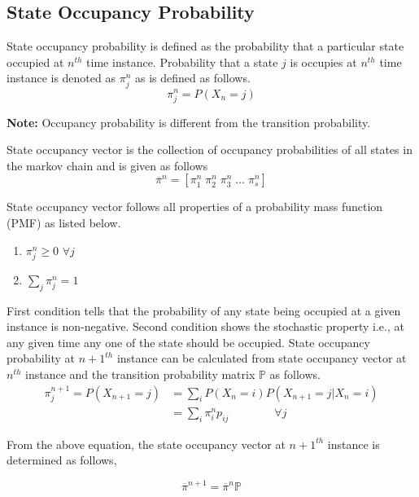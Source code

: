   \subsection{State Occupancy Probability}
  State occupancy probability is defined as the probability that a particular state occupied at $n^{th}$ time instance. Probability that a state $j$  is occupies at $n^{th}$ time instance is denoted as $\pi_{j}^{n}$ as is defined as follows.
  \begin{equation*}
      \pi_j^n=P(X_n=j)
  \end{equation*}
  
  \textbf{Note:} Occupancy probability is different from the transition probability. 
  
  State occupancy vector is the collection of occupancy probabilities of all states in the markov chain and is given as follows 
  \begin{equation*}
      \overline{\pi}^n=[\pi^n_1\; \pi^n_2\; \pi^n_3\; \dots\; \pi^n_s]
  \end{equation*}
  
  State occupancy vector follows all properties of a probability mass function (PMF) as listed below.
  
  \begin{enumerate}
      \item $\pi^n_j\geq 0$ $\forall j$
      \item $\sum_j \pi^n_j =1$
  \end{enumerate}
  
  First condition tells that the probability of any state being occupied at a given instance is non-negative. Second condition shows the stochastic property i.e., at any given time any one of the state should be occupied.  State occupancy probability at $n+1^{th}$ instance can be calculated from state occupancy vector at $n^{th}$ instance and the transition probability matrix $\mathbb{P}$ as follows.
  \begin{align*}
       \pi_j^{n+1}=P(X_{n+1}=j)&=\sum_iP(X_n=i)P(X_{n+1}=j|X_n=i)\\
       &=\sum_i \pi^n_i p_{ij} \qquad\qquad \forall j
  \end{align*}
  
  From the above equation, the state occupancy vector at $n+1^{th}$ instance is determined as follows,
  
  \begin{equation*}
      \overline{\pi}^{n+1}=\overline{\pi}^n \mathbb{P}
  \end{equation*}


